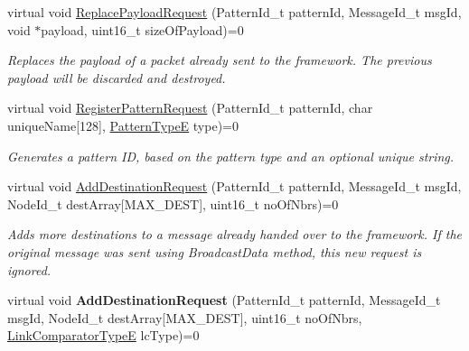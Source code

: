\begin{DoxyCompactItemize}
\item 
virtual void \hyperlink{class_p_w_i_1_1_framework___i_ad6f5e981436d5ffa471fb5631463b85d}{Replace\+Payload\+Request} (Pattern\+Id\+\_\+t pattern\+Id, Message\+Id\+\_\+t msg\+Id, void $\ast$payload, uint16\+\_\+t size\+Of\+Payload)=0
\begin{DoxyCompactList}\small\item\em Replaces the payload of a packet already sent to the framework. The previous payload will be discarded and destroyed. \end{DoxyCompactList}\item 
virtual void \hyperlink{class_p_w_i_1_1_framework___i_ab960254f2b72eca6ec822129bd26c977}{Register\+Pattern\+Request} (Pattern\+Id\+\_\+t pattern\+Id, char unique\+Name\mbox{[}128\mbox{]}, \hyperlink{namespace_core_1_1_naming_ab40d44ea919ec3e3c8cc05576ba6d610}{Pattern\+TypeE} type)=0
\begin{DoxyCompactList}\small\item\em Generates a pattern ID, based on the pattern type and an optional unique string. \end{DoxyCompactList}\item 
virtual void \hyperlink{class_p_w_i_1_1_framework___i_aee8ff64049e3908e47ad92c5d8cd2485}{Add\+Destination\+Request} (Pattern\+Id\+\_\+t pattern\+Id, Message\+Id\+\_\+t msg\+Id, Node\+Id\+\_\+t dest\+Array\mbox{[}M\+A\+X\+\_\+\+D\+E\+ST\mbox{]}, uint16\+\_\+t no\+Of\+Nbrs)=0
\begin{DoxyCompactList}\small\item\em Adds more destinations to a message already handed over to the framework. If the original message was sent using Broadcast\+Data method, this new request is ignored. \end{DoxyCompactList}\item 
virtual void {\bfseries Add\+Destination\+Request} (Pattern\+Id\+\_\+t pattern\+Id, Message\+Id\+\_\+t msg\+Id, Node\+Id\+\_\+t dest\+Array\mbox{[}M\+A\+X\+\_\+\+D\+E\+ST\mbox{]}, uint16\+\_\+t no\+Of\+Nbrs, \hyperlink{namespace_p_w_i_1_1_neighborhood_a54f3d64f52739fa54193660451fd8a6f}{Link\+Comparator\+TypeE} lc\+Type)=0\hypertarget{class_p_w_i_1_1_framework___i_a887538b053128e1d10b442ee0c659a0b}{}\label{class_p_w_i_1_1_framework___i_a887538b053128e1d10b442ee0c659a0b}


\end{DoxyCompactItemize}
